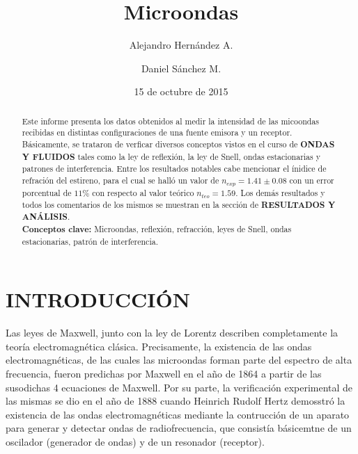 \documentclass[prb,aps,twocolumn,preprintnumbers,amsmath,amssymb]{revtex4}
\begin{document}
\title{Microondas}%

\author{Alejandro Hernández A.}%
\author{Daniel Sánchez M.}%
%

\date{15 de octubre de 2015}%

\begin{abstract}
Este informe presenta los datos obtenidos al medir la intensidad de las micoondas recibidas en distintas configuraciones de una fuente emisora y un receptor. Básicamente, se trataron de verficar diversos conceptos vistos en el curso de \textbf{ONDAS Y FLUIDOS} tales como la ley de reflexión, la ley de Snell, ondas estacionarias y patrones de interferencia. Entre los resultados notables cabe mencionar el ínidice de refración del estireno, para el cual se halló un valor de $n_{exp} = 1.41 \pm 0.08$ con un error porcentual de $11\%$ con respecto al valor teórico $n_{teo} = 1.59$. Los demás resultados y todos los comentarios de los mismos se muestran en la sección de \textbf{RESULTADOS Y ANÁLISIS}.\\

\noindent \textbf{Conceptos clave:} Microondas, reflexión, refracción, leyes de Snell, ondas estacionarias, patrón de interferencia.
\end{abstract}
                             
\maketitle

\section{INTRODUCCIÓN}
Las leyes de Maxwell, junto con la ley de Lorentz describen completamente la teoría electromagnética clásica. Precisamente, la existencia de las ondas electromagnéticas, de las cuales las microondas forman parte del espectro de alta frecuencia, fueron predichas por Maxwell en el año de 1864 a partir de las susodichas 4 ecuaciones de Maxwell. Por su parte, la verificación experimental de las mismas se dio en el año de 1888 cuando Heinrich Rudolf Hertz demosstró la existencia de las ondas electromagnéticas mediante la contrucción de un aparato para generar y detectar ondas de radiofrecuencia, que consistía básicemtne de un oscilador (generador de ondas) y de un resonador (receptor).\\
\end{document}
